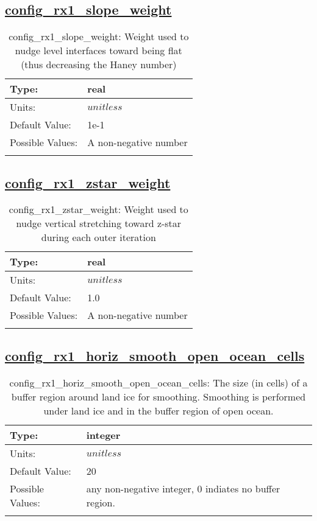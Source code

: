 \subsection[config\_rx1\_slope\_weight]{\hyperref[sec:nm_tab_constrain_Haney_number]{config\_rx1\_slope\_weight}}
\label{subsec:nm_sec_config_rx1_slope_weight}
\begin{center}
\begin{longtable}{| p{2.0in} || p{4.0in} |}
    \hline
    Type: & real \\
    \hline
    Units: & $unitless$ \\
    \hline
    Default Value: & 1e-1 \\
    \hline
    Possible Values: & A non-negative number \\
    \hline
    \caption{config\_rx1\_slope\_weight: Weight used to nudge level interfaces toward being flat (thus decreasing the Haney number)}
\end{longtable}
\end{center}
\subsection[config\_rx1\_zstar\_weight]{\hyperref[sec:nm_tab_constrain_Haney_number]{config\_rx1\_zstar\_weight}}
\label{subsec:nm_sec_config_rx1_zstar_weight}
\begin{center}
\begin{longtable}{| p{2.0in} || p{4.0in} |}
    \hline
    Type: & real \\
    \hline
    Units: & $unitless$ \\
    \hline
    Default Value: & 1.0 \\
    \hline
    Possible Values: & A non-negative number \\
    \hline
    \caption{config\_rx1\_zstar\_weight: Weight used to nudge vertical stretching toward z-star during each outer iteration}
\end{longtable}
\end{center}
\subsection[config\_rx1\_horiz\_smooth\_open\_ocean\_cells]{\hyperref[sec:nm_tab_constrain_Haney_number]{config\_rx1\_horiz\_smooth\_open\_ocean\_cells}}
\label{subsec:nm_sec_config_rx1_horiz_smooth_open_ocean_cells}
\begin{center}
\begin{longtable}{| p{2.0in} || p{4.0in} |}
    \hline
    Type: & integer \\
    \hline
    Units: & $unitless$ \\
    \hline
    Default Value: & 20 \\
    \hline
    Possible Values: & any non-negative integer, 0 indiates no buffer region. \\
    \hline
    \caption{config\_rx1\_horiz\_smooth\_open\_ocean\_cells: The size (in cells) of a buffer region around land ice for smoothing.  Smoothing is performed under land ice and in the buffer region of open ocean.}
\end{longtable}
\end{center}
